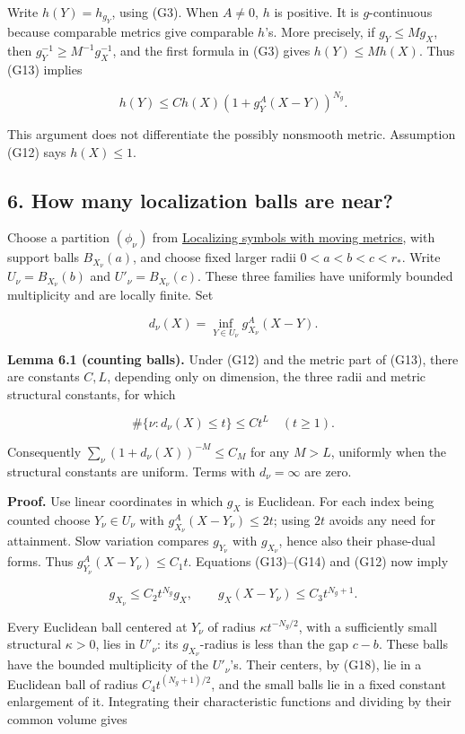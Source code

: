\documentclass[
  11pt,
]{article}
\begin{document}
Write \(h(Y)=h_{g_Y}\), using (G3). When \(A\ne0\), \(h\) is positive.
It is \(g\)-continuous because comparable metrics give comparable
\(h\)'s. More precisely, if \(g_Y\leq M g_X\), then
\(g_Y^{-1}\geq M^{-1}g_X^{-1}\), and the first formula in (G3) gives
\(h(Y)\leq Mh(X)\). Thus (G13) implies

\[
h(Y)\leq C h(X)(1+g_Y^A(X-Y))^{N_g}.                         \tag{G15}
\]

This argument does not differentiate the possibly nonsmooth metric.
Assumption (G12) says \(h(X)\leq1\).

\subsection{6. How many localization balls are
near?}\label{how-many-localization-balls-are-near}

Choose a partition \((\phi_\nu)\) from
\href{metric-localization.pdf}{Localizing symbols with moving metrics},
with support balls \(B_{X_\nu}(a)\), and choose fixed larger radii
\(0<a<b<c<r_*\). Write \(U_\nu=B_{X_\nu}(b)\) and
\(U'_\nu=B_{X_\nu}(c)\). These three families have uniformly bounded
multiplicity and are locally finite. Set

\[
d_\nu(X)=\inf_{Y\in U_\nu}g_{X_\nu}^A(X-Y).                  \tag{G16}
\]

\textbf{Lemma 6.1 (counting balls).} Under (G12) and the metric part of
(G13), there are constants \(C,L\), depending only on dimension, the
three radii and metric structural constants, for which

\[
\#\{\nu:d_\nu(X)\leq t\}\leq Ct^L\quad(t\geq1).
                                                               \tag{G17}
\]

Consequently \(\sum_\nu(1+d_\nu(X))^{-M}\leq C_M\) for any \(M>L\),
uniformly when the structural constants are uniform. Terms with
\(d_\nu=\infty\) are zero.

\textbf{Proof.} Use linear coordinates in which \(g_X\) is Euclidean.
For each index being counted choose \(Y_\nu\in U_\nu\) with
\(g_{X_\nu}^A(X-Y_\nu)\leq2t\); using \(2t\) avoids any need for
attainment. Slow variation compares \(g_{Y_\nu}\) with \(g_{X_\nu}\),
hence also their phase-dual forms. Thus
\(g_{Y_\nu}^A(X-Y_\nu)\leq C_1t\). Equations (G13)--(G14) and (G12) now
imply

\[
g_{X_\nu}\leq C_2t^{N_g}g_X,\qquad
g_X(X-Y_\nu)\leq C_3t^{N_g+1}.                              \tag{G18}
\]

Every Euclidean ball centered at \(Y_\nu\) of radius
\(\kappa t^{-N_g/2}\), with a sufficiently small structural
\(\kappa>0\), lies in \(U'_\nu\): its \(g_{X_\nu}\)-radius is less than
the gap \(c-b\). These balls have the bounded multiplicity of the
\(U'_\nu\)'s. Their centers, by (G18), lie in a Euclidean ball of radius
\(C_4t^{(N_g+1)/2}\), and the small balls lie in a fixed constant
enlargement of it. Integrating their characteristic functions and
dividing by their common volume gives
\end{document}
